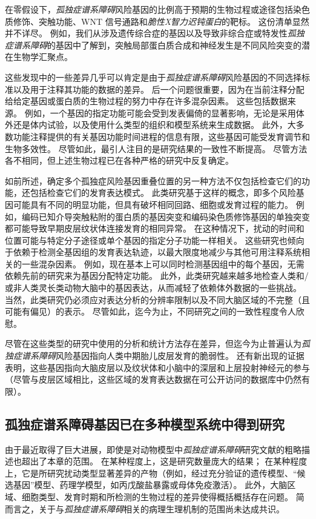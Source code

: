 在零假设下，\textit{孤独症谱系障碍}风险基因的比例高于预期的生物过程或途径包括染色质修饰、突触功能、WNT 信号通路和\textit{脆性X智力迟钝蛋白}的靶标。
这份清单显然并不详尽。
例如，我们从涉及遗传综合症的基因以及导致非综合症或特发性\textit{孤独症谱系障碍}的基因中了解到，突触局部蛋白质合成和神经发生是不同风险突变的潜在生物学汇聚点。


这些发现中的一些差异几乎可以肯定是由于\textit{孤独症谱系障碍}风险基因的不同选择标准以及用于注释其功能的数据的差异。
后一个问题很重要，因为在当前注释分配给给定基因或蛋白质的生物过程的努力中存在许多混杂因素。
这些包括数据来源。
例如，一个基因的指定功能可能会受到发表偏倚的显著影响，无论是采用体外还是体内试验，以及使用什么类型的组织和模型系统来生成数据。
此外，大多数功能注释提供的有关基因功能时间进程的信息有限，这些基因可能受发育调节和生物多效性。
尽管如此，最引人注目的是研究结果的一致性不断提高。
尽管方法各不相同，但上述生物过程已在各种严格的研究中反复确定。


如前所述，确定多个孤独症风险基因重叠位置的另一种方法不仅包括检查它们的功能，还包括检查它们的发育表达模式。
此类研究基于这样的概念，即多个风险基因可能具有不同的明显功能，但具有破坏相同回路、细胞或发育过程的能力。
例如，编码已知介导突触粘附的蛋白质的基因突变和编码染色质修饰基因的单独突变都可能导致早期皮层纹状体连接发育的相同异常。
在这种情况下，扰动的时间和位置可能与特定分子途径或单个基因的指定分子功能一样相关。
这些研究也倾向于依赖于检测全基因组的发育表达轨迹，以最大限度地减少与其他可用注释系统相关的一些混杂因素。
例如，现在基本上可以同时检测基因组中的每个基因，无需依赖先前的研究来为基因分配特定功能。
此外，此类研究越来越多地检查人类和/或非人类灵长类动物大脑中的基因表达，从而减轻了依赖体外数据的一些挑战。
当然，此类研究仍必须应对表达分析的分辨率限制以及不同大脑区域的不完整（且可能有偏见）的表示。
尽管如此，迄今为止，不同研究之间的一致性程度令人欣慰。


尽管在这些类型的研究中使用的分析和统计方法存在差异，但迄今为止普遍认为\textit{孤独症谱系障碍}风险基因指向人类中期胎儿皮层发育的脆弱性。
还有新出现的证据表明，这些基因指向大脑皮层以及纹状体和小脑中的深层和上层投射神经元的参与（尽管与皮层区域相比，这些区域的发育表达数据在可公开访问的数据库中仍然有限）。



\subsection{孤独症谱系障碍基因已在多种模型系统中得到研究}

由于最近取得了巨大进展，即使是对动物模型中\textit{孤独症谱系障碍}研究文献的粗略描述也超出了本章的范围。
在某种程度上，这是研究数量庞大的结果； 在某种程度上，它是所研究扰动类型显著差异的产物（例如，经过充分验证的遗传模型、“候选基因”模型、药理学模型，如丙戊酸盐暴露或母体免疫激活）。
此外，大脑区域、细胞类型、发育时期和所检测的生物过程的差异使得概括概括存在问题。
简而言之，关于与\textit{孤独症谱系障碍}相关的病理生理机制的范围尚未达成共识。


